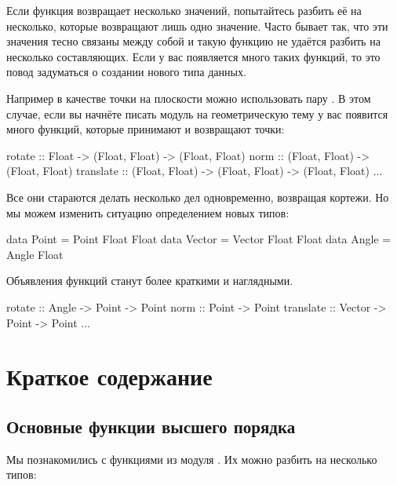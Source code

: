 Если функция возвращает несколько значений, попытайтесь
разбить её на несколько, которые возвращают лишь одно
значение. Часто бывает так, что эти значения тесно связаны
между собой и такую функцию не удаётся разбить на 
несколько составляющих. Если у вас появляется много 
таких функций, то это повод задуматься о создании нового
типа данных. 

Например в качестве точки на плоскости можно использовать
пару . В этом случае, если вы начнёте 
писать модуль на геометрическую тему у вас появится много функций,
которые принимают и возвращают точки:

\begin{code}
rotate      :: Float -> (Float, Float) -> (Float, Float)
norm        :: (Float, Float) -> (Float, Float)
translate   :: (Float, Float) -> (Float, Float) -> (Float, Float)
...    
\end{code}

Все они стараются делать несколько дел одновременно,
возвращая кортежи. Но мы можем изменить ситуацию 
определением новых типов:

\begin{code}
data Point  = Point  Float Float
data Vector = Vector Float Float
data Angle  = Angle  Float
\end{code}

Объявления функций станут более краткими и наглядными.

\begin{code}
rotate      :: Angle  -> Point -> Point
norm        :: Point  -> Point
translate   :: Vector -> Point -> Point
...    
\end{code}


\section{Краткое содержание}


\subsection*{Основные функции высшего порядка}

Мы познакомились с функциями из модуля .
Их можно разбить на несколько типов:


